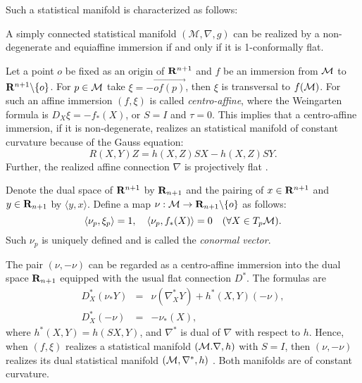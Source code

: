 \documentclass{llncs}
\begin{document}
 

Such a statistical manifold is characterized as follows:
\begin{proposition} \cite{Kurose94}
\label{Tohoku}
A simply connected statistical manifold
$(\mathcal{M},\nabla,g)$ can be realized by a non-degenerate and 
equiaffine immersion 
if and only if it is 1-conformally flat. 
\end{proposition}

Let a point $o$ be fixed as an origin of ${\bf R}^{n+1}$ and 
$f$ be an immersion from ${\cal M}$ to ${\bf R}^{n+1} \backslash \{ o \}$. 
For $p \in {\cal M}$ take $\xi=-\overrightarrow{of(p)}$, 
then $\xi$ is transversal to $f({\cal M})$.
For such an affine immersion $(f,\xi)$ 
is called {\em centro-affine}, where 
the Weingarten formula is $D_X \xi =- f_*(X)$, 
or $S= I$ and $\tau=0$.
This implies that a centro-affine immersion, if it is non-degenerate, 
realizes an statistical manifold of constant curvature  
because of the Gauss equation:
\[
	R(X,Y)Z=h(X,Z)SX-h(X,Z)SY.
\]
Further, the realized affine connection $\nabla$ is projectively flat \cite{NS}.

Denote the dual space of ${\bf R}^{n+1}$ by ${\bf R}_{n+1}$ and 
the pairing of $x \in {\bf R}^{n+1}$ and $y \in {\bf R}_{n+1}$ by 
$\langle y, x \rangle$.
Define a map $\nu: {\cal M} \rightarrow {\bf R}_{n+1} \backslash \{o\}$ 
as follows:
\[
	\langle \nu_p, \xi_p \rangle =1, \quad 
	\langle \nu_p, f_*(X) \rangle =0 \quad (\forall X \in T_p {\cal M}).
\]
Such $\nu_p$ is uniquely defined and is called the {\em conormal vector}.

The pair $(\nu, -\nu)$ can be regarded as a centro-affine immersion into 
the dual space ${\bf R}_{n+1}$ equipped with the usual flat connection $D^*$.
The formulas are
\begin{eqnarray*}
	D^*_X(\nu_* Y)&=&\nu(\nabla^*_X Y)+h^*(X,Y)(-\nu), \\
	D^*_X (-\nu) &=& - \nu_*(X), 
\end{eqnarray*}
where $h^*(X,Y)=h(SX,Y)$, and $\nabla^*$ is dual of 
$\nabla$ with respect to $h$.
Hence, when $(f,\xi)$ realizes a statistical manifold $({\cal M}.\nabla,h)$ 
with $S=I$, then 
$(\nu, -\nu)$ realizes its dual statistical manifold 
$({\cal M}, \nabla^*, h)$ \cite{NS}.
Both manifolds are of constant curvature.
\end{document}
